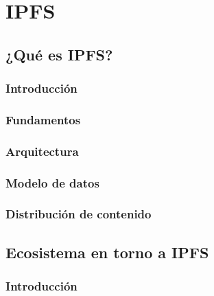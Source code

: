 \chapter{IPFS}
\label{chap:ipfs}
\section{¿Qué es IPFS?}
\subsection{Introducción}
\subsection{Fundamentos}
\subsection{Arquitectura}
\subsection{Modelo de datos}
\subsection{Distribución de contenido}

\section{Ecosistema en torno a IPFS}

\subsection{Introducción}
